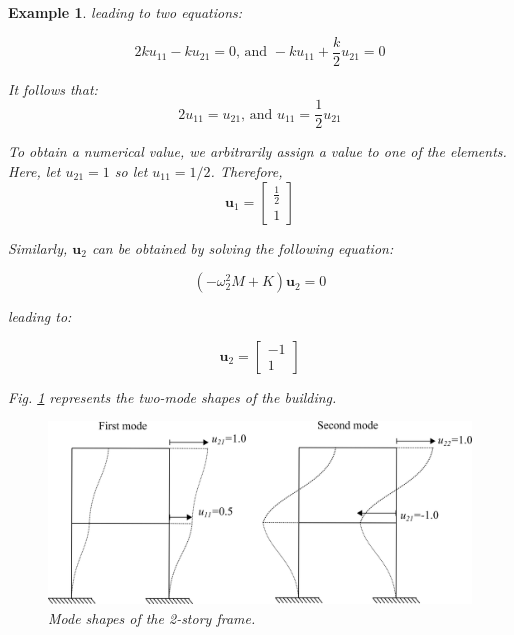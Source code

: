 \documentclass[12pt,letter]{article}
\newtheorem{ex}{Example}
\numberwithin{ex}{section} %
\newenvironment{example}{\begin{mdframed}[middlelinewidth=0.5mm]\begin{ex}\normalfont}{\end{ex}\end{mdframed}}
\numberwithin{re}{section} %
\numberwithin{vcs}{section} %
\begin{document}
\begin{example}
\noindent leading to two equations:

\begin{equation}
2 k u_{11} -k u_{21}=0 \text{, and } -k u_{11} + \frac{k}{2} u_{21}=0
\end{equation}

\noindent It follows that:
\begin{equation}
2 u_{11}= u_{21}  \text{, and } u_{11} = \frac{1}{2}u_{21}
\end{equation}

\noindent To obtain a numerical value, we arbitrarily assign a value to one of the elements. Here, let $u_{21}=1$ so let $u_{11}=1/2$. Therefore, 
\begin{equation}
\textbf{u}_1 = \begin{bmatrix} \frac{1}{2}\\ 1\end{bmatrix}
\end{equation}

\noindent Similarly, $\mathbf{u}_2$ can be obtained by solving the following equation:

\begin{equation}
(-\omega_2^2 M  + K)\mathbf{u}_2 =0
\end{equation}

\noindent leading to:

\begin{equation}
	\textbf{u}_2 = \begin{bmatrix} -1\\ 1\end{bmatrix}
\end{equation}

\noindent Fig. \ref{fig:modeshapes} represents the two-mode shapes of the building. 

\vspace{4ex}

\begin{figure}[H]
	\centering
	\includegraphics{../figures/two_story_frame_example_mode_shapes.png}
	\caption{Mode shapes of the 2-story frame.}
	\label{fig:modeshapes}
\end{figure}


\end{example}
\end{document}

